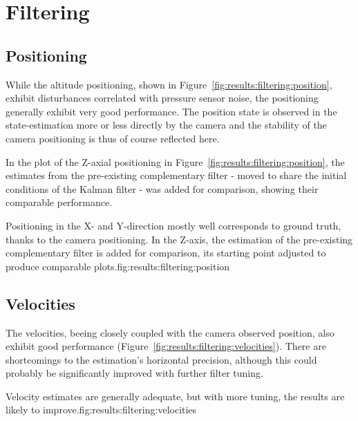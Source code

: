 \section{Filtering}
\label{sec:results:filtering}
\subsection{Positioning}
    While the altitude positioning, shown in Figure~\ref{fig:results:filtering:position},
    exhibit disturbances correlated with pressure sensor noise,
    the positioning generally exhibit very good performance. The position state
    is observed in the state-estimation more or less directly by the camera
    and the stability of the camera positioning is thus of course reflected here.

    In the plot of the Z-axial positioning in Figure~\ref{fig:results:filtering:position},
    the estimates from the pre-existing complementary filter -
    moved to share the initial conditions of the Kalman filter - was added for
    comparison, showing their comparable performance.

    \begin{subfigures}{Positioning in the X- and Y-direction mostly well corresponds to ground truth, thanks to the camera positioning.
    In the Z-axis, the estimation of the pre-existing complementary filter is added for comparison, its starting point adjusted to produce comparable plots.}{fig:results:filtering:position}
    \end{subfigures}

\subsection{Velocities}
    The velocities, beeing closely coupled with the camera observed position,
    also exhibit good performance (Figure~\ref{fig:results:filtering:velocities}).
    There are shortcomings to the estimation's horizontal precision, although
    this could probably be significantly improved with further filter tuning.
    \begin{subfigures}{Velocity estimates are generally adequate, but with more tuning, the results are likely to improve.}{fig:results:filtering:velocities}
    \end{subfigures}

